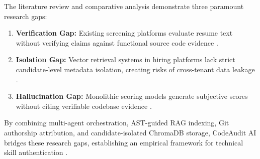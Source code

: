 The literature review and comparative analysis demonstrate three paramount research gaps:
\begin{enumerate}[leftmargin=*, label=\arabic*.]
    \item \textbf{Verification Gap:} Existing screening platforms evaluate resume text without verifying claims against functional source code evidence \cite{ref1, ref9, ref8}.
    \item \textbf{Isolation Gap:} Vector retrieval systems in hiring platforms lack strict candidate-level metadata isolation, creating risks of cross-tenant data leakage \cite{ref31, ref33, ref34}.
    \item \textbf{Hallucination Gap:} Monolithic scoring models generate subjective scores without citing verifiable codebase evidence \cite{ref20, ref17, ref29}.
\end{enumerate}

By combining multi-agent orchestration, AST-guided RAG indexing, Git authorship attribution, and candidate-isolated ChromaDB storage, CodeAudit AI bridges these research gaps, establishing an empirical framework for technical skill authentication \cite{ref30, ref37, ref33, ref38}.